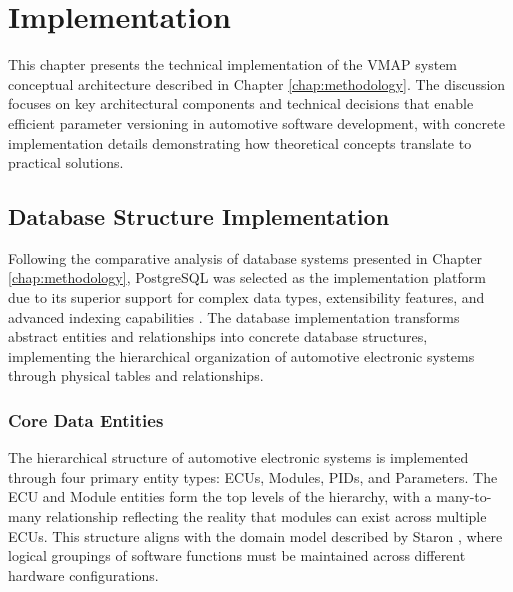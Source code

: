 \chapter{Implementation}
\label{chap:implementation}

This chapter presents the technical implementation of the \ac{VMAP} system conceptual architecture described in Chapter \ref{chap:methodology}. The discussion focuses on key architectural components and technical decisions that enable efficient parameter versioning in automotive software development, with concrete implementation details demonstrating how theoretical concepts translate to practical solutions.

\section{Database Structure Implementation}
\label{sec:database-structure-implementation}

Following the comparative analysis of database systems presented in Chapter \ref{chap:methodology}, PostgreSQL was selected as the implementation platform due to its superior support for complex data types, extensibility features, and advanced indexing capabilities \cite{obe2017postgresql}. The database implementation transforms abstract entities and relationships into concrete database structures, implementing the hierarchical organization of automotive electronic systems through physical tables and relationships.

\subsection{Core Data Entities}
\label{subsec:core-data-entities}

The hierarchical structure of automotive electronic systems is implemented through four primary entity types: \acp{ECU}, Modules, \acp{PID}, and Parameters. The \ac{ECU} and Module entities form the top levels of the hierarchy, with a many-to-many relationship reflecting the reality that modules can exist across multiple \acp{ECU}. This structure aligns with the domain model described by Staron \cite{staron2021automotive}, where logical groupings of software functions must be maintained across different hardware configurations.

